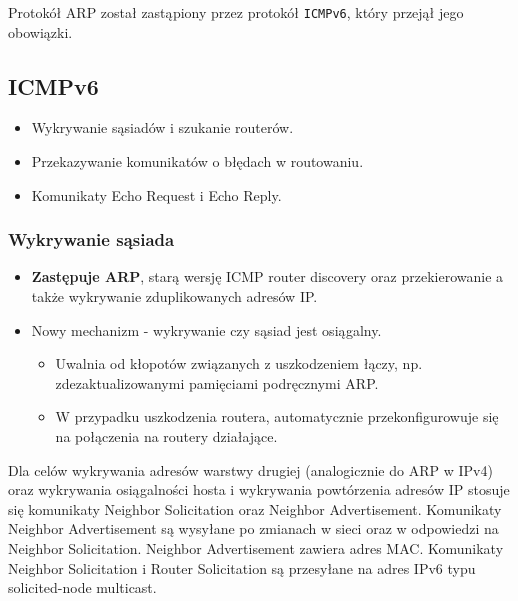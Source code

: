 \documentclass[../sk-egzamin.tex]{subfiles}
\begin{document}

Protokół ARP został zastąpiony przez protokół \texttt{ICMPv6}, który przejął
jego obowiązki.

\subsection*{ICMPv6}

\begin{itemize}
    \item Wykrywanie sąsiadów i szukanie routerów.
    \item Przekazywanie komunikatów o błędach w routowaniu.
    \item Komunikaty Echo Request i Echo Reply.
\end{itemize}

\subsubsection*{Wykrywanie sąsiada }

\begin{itemize}
    \item \textbf{Zastępuje ARP}, starą wersję ICMP router discovery oraz
    przekierowanie a także wykrywanie zduplikowanych adresów IP.
    \item Nowy mechanizm - wykrywanie czy sąsiad jest osiągalny.
    \begin{itemize}
        \item Uwalnia od kłopotów związanych z uszkodzeniem łączy,
        np. zdezaktualizowanymi pamięciami podręcznymi ARP.
        \item W przypadku uszkodzenia routera, automatycznie przekonfigurowuje
        się na połączenia na routery działające.
    \end{itemize}
\end{itemize}

Dla celów wykrywania adresów warstwy drugiej (analogicznie do ARP w IPv4) oraz
wykrywania osiągalności hosta i wykrywania powtórzenia adresów IP stosuje się
komunikaty Neighbor Solicitation oraz Neighbor Advertisement.
Komunikaty Neighbor Advertisement są wysyłane po zmianach w sieci oraz w
odpowiedzi na Neighbor Solicitation.
Neighbor Advertisement zawiera adres MAC.
Komunikaty Neighbor Solicitation i Router Solicitation są przesyłane na adres
IPv6 typu solicited-node multicast.

\pagebreak
\end{document}
